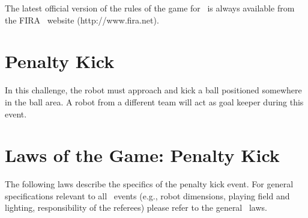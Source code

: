\documentclass[12pt]{hurocup}
\begin{document}
The latest official version of the rules of the game for \HuroCup\ is
always available from the FIRA \HuroCup\ website (http://www.fira.net).

\newpage

\section{Penalty Kick}
\label{sec:penalty-kick}

In this challenge, the robot must approach and kick a ball positioned
somewhere in the ball area. A robot from a different team will act as
goal keeper during this event.

\section{Laws of the Game: Penalty Kick}
\label{sec:laws-penalty-kicks}

The following laws describe the specifics of the penalty kick event. For
general specifications relevant to all \HuroCup\ events (e.g., robot
dimensions, playing field and lighting, responsibility of the
referees) please refer to the general \HuroCup\ laws.

\label{pk-field}
\end{document}
